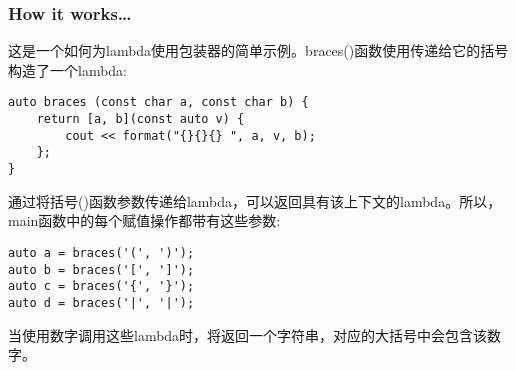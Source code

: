\subsubsection{How it works…}

这是一个如何为lambda使用包装器的简单示例。braces()函数使用传递给它的括号构造了一个lambda:

\begin{lstlisting}[style=styleCXX]
auto braces (const char a, const char b) {
	return [a, b](const auto v) {
		cout << format("{}{}{} ", a, v, b);
	};
}
\end{lstlisting}

通过将括号()函数参数传递给lambda，可以返回具有该上下文的lambda。所以，main函数中的每个赋值操作都带有这些参数:

\begin{lstlisting}[style=styleCXX]
auto a = braces('(', ')');
auto b = braces('[', ']');
auto c = braces('{', '}');
auto d = braces('|', '|');
\end{lstlisting}

当使用数字调用这些lambda时，将返回一个字符串，对应的大括号中会包含该数字。









